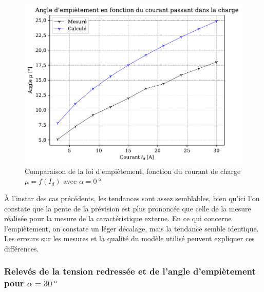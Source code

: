 \documentclass[a4paper, 11pt, openany, oneside, french]{article}
\begin{document}
\begin{figure}[!ht]
    \centering
    \includegraphics[width=0.8\linewidth]{exp1_graph11}
    \caption{Comparaison de la loi d'empiètement, fonction du courant de charge $\mu=f\left(I_d\right)$ avec $\alpha = \SI{0}{\degree}$}
    \label{fig:exp1grap11}
\end{figure}
 
À l'instar des cas précédents, les tendances sont assez semblables, bien qu'ici l'on constate que la pente de la prévision est plus prononcée que celle de la mesure réalisée pour la mesure de la caractéristique externe. En ce qui concerne l'empiètement, on constate un léger décalage, mais la tendance semble identique. Les erreurs sur les mesures et la qualité du modèle utilisé peuvent expliquer ces différences.
 
\clearpage
\subsubsection{Relevés de la tension redressée et de l'angle d'empiètement pour $\alpha = \SI{30}{\degree}$}
\end{document}
